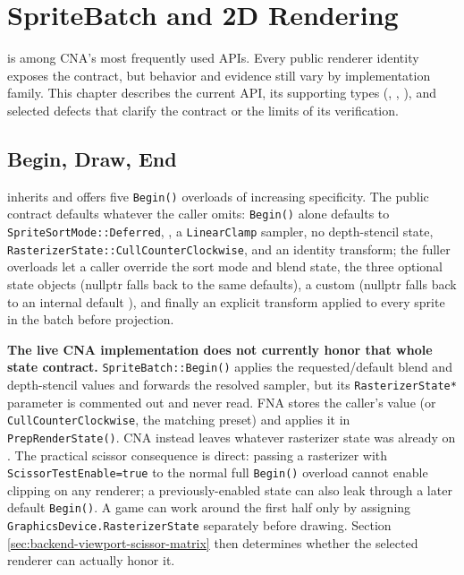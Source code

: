 \chapter{SpriteBatch and 2D Rendering}
\label{ch:spritebatch}

 is among CNA's most frequently used APIs. Every public renderer
identity exposes the contract, but behavior and evidence still vary by implementation family.
This chapter describes the current API, its supporting types (,
, ), and selected defects that clarify the
contract or the limits of its verification.



\section{Begin, Draw, End}

 inherits  and offers five \texttt{Begin()}
overloads of increasing specificity. The public contract defaults whatever the caller omits:
\texttt{Begin()} alone defaults to \texttt{SpriteSortMode::Deferred},
, a \texttt{LinearClamp} sampler, no depth-stencil state,
\texttt{RasterizerState::\allowbreak{}CullCounterClockwise}, and an identity transform; the fuller
overloads let a caller override the sort mode and blend state, the three optional state
objects (nullptr falls back to the same defaults), a custom  (nullptr falls
back to an internal default ), and finally an explicit transform
 applied to every sprite in the batch before projection.

\begin{sourcenote}
\textbf{The live CNA implementation does not currently honor that whole state contract.}
\texttt{SpriteBatch::Begin()} applies the requested/default blend and depth-stencil values and
forwards the resolved sampler, but its \texttt{RasterizerState*} parameter is commented out and
never read. FNA stores the caller's value (or
\texttt{CullCounterClockwise}, the matching  preset) and applies it in
\texttt{PrepRenderState()}. CNA instead leaves whatever rasterizer state was already on
. The practical scissor consequence is direct: passing a rasterizer
with \texttt{ScissorTestEnable=true} to the normal full \texttt{Begin()} overload cannot enable
clipping on any renderer; a previously-enabled state can also leak through a later default
\texttt{Begin()}. A game can work around the first half only by assigning
\texttt{GraphicsDevice.RasterizerState} separately before drawing. Section
\ref{sec:backend-viewport-scissor-matrix} then determines whether the selected renderer can
actually honor it.
\end{sourcenote}

